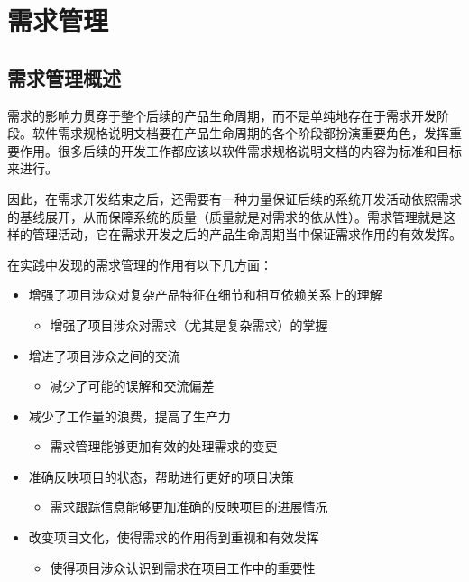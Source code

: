 \section{需求管理}

\subsection{需求管理概述}
需求的影响力贯穿于整个后续的产品生命周期，而不是单纯地存在于需求开发阶段。软件需求规格说明文档要在产品生命周期的各个阶段都扮演重要角色，发挥重要作用。很多后续的开发工作都应该以软件需求规格说明文档的内容为标准和目标来进行。

因此，在需求开发结束之后，还需要有一种力量保证后续的系统开发活动依照需求的基线展开，从而保障系统的质量（质量就是对需求的依从性）。需求管理就是这样的管理活动，它在需求开发之后的产品生命周期当中保证需求作用的有效发挥。

在实践中发现的需求管理的作用有以下几方面：
\begin{itemize}
    \item 增强了项目涉众对复杂产品特征在细节和相互依赖关系上的理解
    \begin{itemize}
        \item 增强了项目涉众对需求（尤其是复杂需求）的掌握
    \end{itemize}
    \item 增进了项目涉众之间的交流
    \begin{itemize}
        \item 减少了可能的误解和交流偏差
    \end{itemize}
    \item 减少了工作量的浪费，提高了生产力
    \begin{itemize}
        \item 需求管理能够更加有效的处理需求的变更
    \end{itemize}
    \item 准确反映项目的状态，帮助进行更好的项目决策
    \begin{itemize}
        \item 需求跟踪信息能够更加准确的反映项目的进展情况
    \end{itemize}
    \item 改变项目文化，使得需求的作用得到重视和有效发挥
    \begin{itemize}
        \item 使得项目涉众认识到需求在项目工作中的重要性
    \end{itemize}
\end{itemize}


